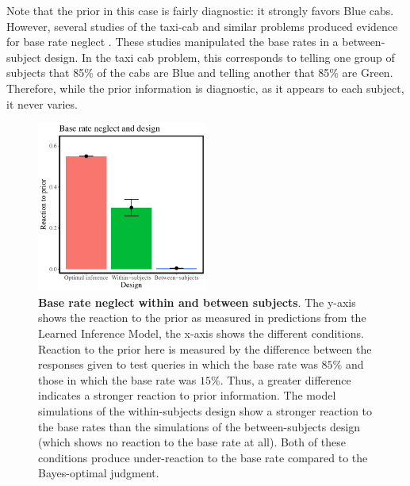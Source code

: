 Note that the prior in this case is fairly diagnostic: it strongly favors Blue cabs. However, several studies of the taxi-cab and similar problems produced evidence for base rate neglect \citep{tversky1973availability, bar1980base,lyon1976dominance}. These studies manipulated the base rates in a between-subject design. In the taxi cab problem, this corresponds to telling one group of subjects that 85\% of the cabs are Blue and telling another that 85\% are Green. Therefore, while the prior information is diagnostic, as it appears to each subject, it never varies.

\begin{figure}
\centering
    \includegraphics[width=0.5\textwidth]{figures/FC_temp.pdf}
  \caption{\textbf{Base rate neglect within and between subjects}. The y-axis shows the reaction to the prior as measured in predictions from the Learned Inference Model, the x-axis shows the different conditions. Reaction to the prior here is measured by the difference between the responses given to test queries in which the base rate was $85\%$ and those in which the base rate was $15\%$. Thus, a greater difference indicates a stronger reaction to prior information. The model simulations of the within-subjects design show a stronger reaction to the base rates than the simulations of the between-subjects design (which shows no reaction to the base rate at all).
  Both of these conditions produce under-reaction to the base rate compared to the Bayes-optimal judgment.} 
  \label{fig:FC}
\end{figure}

